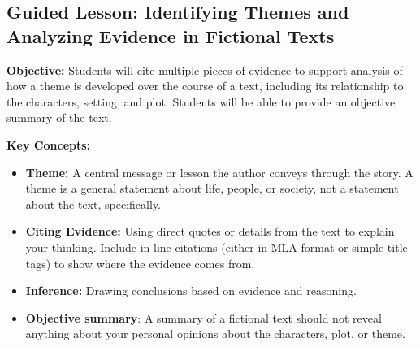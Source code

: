 \documentclass[12pt]{article}
\begin{document}
\subsection*{Guided Lesson: Identifying Themes and Analyzing Evidence in Fictional Texts}
\onehalfspacing

\begin{tcolorbox}[colframe=black!40, colback=gray!5, 
coltitle=black, colbacktitle=black!20, fonttitle=\bfseries\Large, 
title=Learning Objective, halign title=center, left=5pt, right=5pt, top=5pt, bottom=15pt]
\textbf{Objective:} Students will cite multiple pieces of evidence to support analysis of how a theme is developed over the course of a text, including its relationship to the characters, setting, and plot. Students will be able to provide an objective summary of the text.
\end{tcolorbox}

\vspace{1em}

\begin{tcolorbox}[colframe=black!60, colback=white, 
coltitle=black, colbacktitle=black!15, fonttitle=\bfseries\Large, 
title=Key Concepts and Vocabulary, halign title=center, left=10pt, right=10pt, top=10pt, bottom=15pt]
\textbf{Key Concepts:}
\begin{itemize}
    \item \textbf{Theme:} A central message or lesson the author conveys through the story. A theme is a general statement about life, people, or society, not a statement about the text, specifically.
    \item \textbf{Citing Evidence:} Using direct quotes or details from the text to explain your thinking. Include in-line citations (either in MLA format or simple title tags) to show where the evidence comes from.
    \item \textbf{Inference:} Drawing conclusions based on evidence and reasoning.
    \item \textbf{Objective summary}: A summary of a fictional text should not reveal anything about your personal opinions about the characters, plot, or theme. 
\end{itemize}
\end{tcolorbox}

\vspace{1em}
\end{document}

